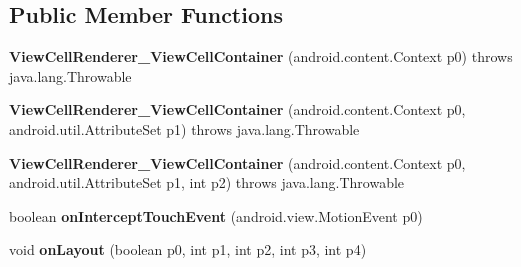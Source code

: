 \subsection*{Public Member Functions}
\begin{DoxyCompactItemize}
\item 
\mbox{\label{classmd5b60ffeb829f638581ab2bb9b1a7f4f3f_1_1ViewCellRenderer__ViewCellContainer_a2573ac4de7f2671992a9bfa260bc4fe1}} 
{\bfseries View\+Cell\+Renderer\+\_\+\+View\+Cell\+Container} (android.\+content.\+Context p0)  throws java.\+lang.\+Throwable 	
\item 
\mbox{\label{classmd5b60ffeb829f638581ab2bb9b1a7f4f3f_1_1ViewCellRenderer__ViewCellContainer_aba0f4072dbb2ab5be4a473be900ab2b7}} 
{\bfseries View\+Cell\+Renderer\+\_\+\+View\+Cell\+Container} (android.\+content.\+Context p0, android.\+util.\+Attribute\+Set p1)  throws java.\+lang.\+Throwable 	
\item 
\mbox{\label{classmd5b60ffeb829f638581ab2bb9b1a7f4f3f_1_1ViewCellRenderer__ViewCellContainer_aca3e2863fea87a844ab7185a603c7e3c}} 
{\bfseries View\+Cell\+Renderer\+\_\+\+View\+Cell\+Container} (android.\+content.\+Context p0, android.\+util.\+Attribute\+Set p1, int p2)  throws java.\+lang.\+Throwable 	
\item 
\mbox{\label{classmd5b60ffeb829f638581ab2bb9b1a7f4f3f_1_1ViewCellRenderer__ViewCellContainer_ada3c5da37f05ad33b1f3e2af8acb10d1}} 
boolean {\bfseries on\+Intercept\+Touch\+Event} (android.\+view.\+Motion\+Event p0)
\item 
\mbox{\label{classmd5b60ffeb829f638581ab2bb9b1a7f4f3f_1_1ViewCellRenderer__ViewCellContainer_a980c2a52c9437398d570f602256c9687}} 
void {\bfseries on\+Layout} (boolean p0, int p1, int p2, int p3, int p4)
\item 
\mbox{\label{classmd5b60ffeb829f638581ab2bb9b1a7f4f3f_1_1ViewCellRenderer__ViewCellContainer_a43bfa04d9cf8132c9b32c3ae7937f7ac}} 

\end{DoxyCompactItemize}
